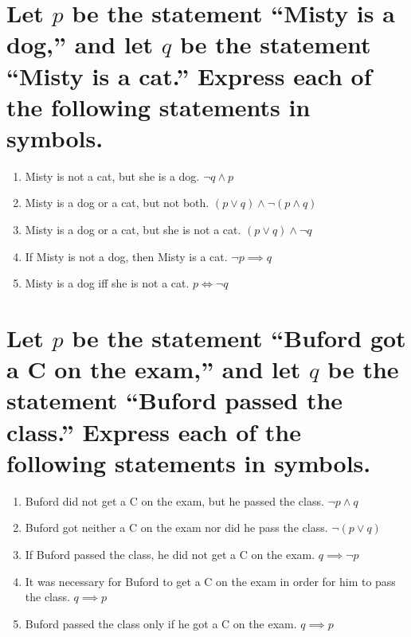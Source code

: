 \documentclass[11pt]{article} %
\begin{document}
\section{Let $p$ be the statement ``Misty is a dog,'' and let $q$ be the statement ``Misty is a cat.'' Express each of the following statements in symbols.}
\begin{enumerate}
\item Misty is not a cat, but she is a dog.
\subitem $\neg q \land p$
\item Misty is a dog or a cat, but not both.
\subitem $(p \lor q) \land \neg(p \land q)$ 
\item Misty is a dog or a cat, but she is not a cat.
\subitem $(p \lor q) \land \neg q$
\item If Misty is not a dog, then Misty is a cat.
\subitem $\neg p \implies q$
\item Misty is a dog iff she is not a cat.
\subitem $p \iff \neg q$
\end{enumerate}

\section{Let $p$ be the statement ``Buford got a C on the exam,'' and let $q$ be the statement ``Buford passed the class.'' Express each of the following statements in symbols.}
\begin{enumerate}
\item Buford did not get a C on the exam, but he passed the class.
\subitem $\neg p \land q$
\item Buford got neither a C on the exam nor did he pass the class.
\subitem $\neg(p \lor q)$
\item If Buford passed the class, he did not get a C on the exam.
\subitem $q \implies \neg p$
\item It was necessary for Buford to get a C on the exam in order for him to pass the class.
\subitem $q \implies p$
\item Buford passed the class only if he got a C on the exam.
\subitem $q \implies p$
\end{enumerate}
\end{document}

